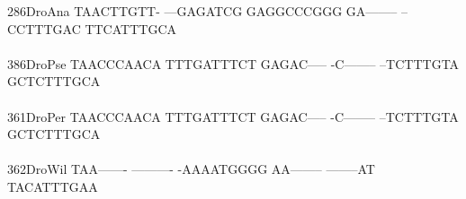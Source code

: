 \documentclass[11pt,twoside,reqno,a4paper]{article}
\begin{document}
{286\hspace*{1\charwidth}DroAna	TAACTTGTT-	---GAGATCG	GAGGCCCGGG	GA--------	--CCTTTGAC	TTCATTTGCA	\\
\hspace*{4\charwidth}\hspace*{7\charwidth}\hspace*{1\charwidth}\hspace*{1\charwidth}\hspace*{1\charwidth}\hspace*{1\charwidth}\hspace*{1\charwidth}\hspace*{1\charwidth}\\
386\hspace*{1\charwidth}DroPse	TAACCCAACA	TTTGATTTCT	GAGAC-----	-C--------	--TCTTTGTA	GCTCTTTGCA	\\
\hspace*{4\charwidth}\hspace*{7\charwidth}\hspace*{1\charwidth}\hspace*{1\charwidth}\hspace*{1\charwidth}\hspace*{1\charwidth}\hspace*{1\charwidth}\hspace*{1\charwidth}\\
361\hspace*{1\charwidth}DroPer	TAACCCAACA	TTTGATTTCT	GAGAC-----	-C--------	--TCTTTGTA	GCTCTTTGCA	\\
\hspace*{4\charwidth}\hspace*{7\charwidth}\hspace*{1\charwidth}\hspace*{1\charwidth}\hspace*{1\charwidth}\hspace*{1\charwidth}\hspace*{1\charwidth}\hspace*{1\charwidth}\\
362\hspace*{1\charwidth}DroWil	TAA-------	----------	-AAAATGGGG	AA--------	--------AT	TACATTTGAA	\\
\hspace*{4\charwidth}\hspace*{7\charwidth}\hspace*{1\charwidth}\hspace*{1\charwidth}\hspace*{1\charwidth}\hspace*{1\charwidth}\hspace*{1\charwidth}\hspace*{1\charwidth}\\
}
\end{document}
